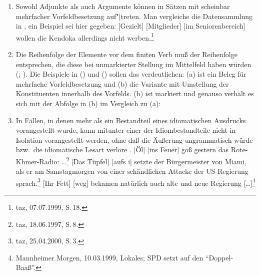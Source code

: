 \begin{enumerate}
\item Sowohl Adjunkte als auch Argumente können in Sätzen mit scheinbar mehrfacher Vorfeldbesetzung auf"|treten.
      Man vergleiche die Datensammlung in , ein Beispiel sei hier gegeben:
      \ea
      {}[Gezielt] [Mitglieder] [im Seniorenbereich] wollen die Kendoka allerdings nicht
      werben.\label{bsp-gezielt-mitglieder}\footnote{
        taz, 07.07.1999, S.\,18.
      }
      \z
\item Die Reihenfolge der Elemente vor dem finiten Verb muß der Reihenfolge entsprechen, 
      die diese bei unmarkierter Stellung im Mittelfeld haben würden 
      (\citealp[--413]{Eisenberg94a}; \citealp[Abschnitt~2.10]{Mueller2005d}).
      Die Beispiele in () und () sollen das verdeutlichen: (a) ist ein Beleg für mehrfache Vorfeldbesetzung
      und (b) die Variante mit Umstellung der Konstituenten innerhalb des Vorfelds.
\eal
{}
\zl
(b) ist markiert und genauso verhält es sich mit der Abfolge in (b) im Vergleich zu (a):
\eal{}
\zl
\item In Fällen, in denen mehr als ein Bestandteil eines idiomatischen Ausdrucks vorangestellt wurde,
      kann mitunter einer der Idiombestandteile nicht in Isolation vorangestellt werden, ohne daß die
      Äußerung ungrammatisch würde bzw.\ die idiomatische Lesart verlöre \citep[Abschnitt~2.9]{Mueller2005d}.
\eal
\ex {}[Öl] [ins Feuer] goß gestern das Rote-Khmer-Radio:
      \ldots\footnote{
        taz, 18.06.1997, S.\,8.
}
\ex{}
{}[Das Tüpfel] [aufs i] setzte der Bürgermeister von Miami, als er am Samstagmorgen von einer schändlichen 
Attacke der US-Regierung sprach.\footnote{
        taz, 25.04.2000, S.\,3. %
    }
\ex {}[Ihr Fett] [weg] bekamen natürlich auch alte und neue Regierung [\ldots]\footnote{
        Mannheimer Morgen, 10.03.1999, Lokales; SPD setzt auf den "`Doppel-Baaß"'. %
      }
\zl
\eal
{}
\zl
\end{enumerate}

